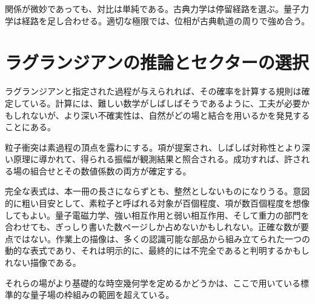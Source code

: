 関係が微妙であっても、対比は単純である。古典力学は停留経路を選ぶ。量子力学は経路を足し合わせる。適切な極限では、位相が古典軌道の周りで強め合う。

\section{ラグランジアンの推論とセクターの選択}

ラグランジアンと指定された過程が与えられれば、その確率を計算する規則は確定している。計算には、難しい数学がしばしばそうであるように、工夫が必要かもしれないが、より深い不確実性は、自然がどの場と結合を用いるかを発見することにある。

\begin{classroomqa}
\end{classroomqa}

粒子衝突は素過程の頂点を露わにする。項が提案され、しばしば対称性とより深い原理に導かれて、得られる振幅が観測結果と照合される。成功すれば、許される場の組合せとその数値係数の両方が確定する。

\begin{classroomqa}
\end{classroomqa}

完全な表式は、本一冊の長さにならずとも、整然としないものになりうる。意図的に粗い目安として、素粒子と呼ばれる対象が百個程度、項が数百個程度を想像してもよい。量子電磁力学、強い相互作用と弱い相互作用、そして重力の部門を合わせても、ぎっしり書いた数ページしか占めないかもしれない。正確な数が要点ではない。作業上の描像は、多くの認識可能な部品から組み立てられた一つの動的な表式であり、それは明示的に、最終的には不完全であると判明するかもしれない描像である。

それらの場がより基礎的な時空幾何学を定めるかどうかは、ここで用いている標準的な量子場の枠組みの範囲を超えている。

